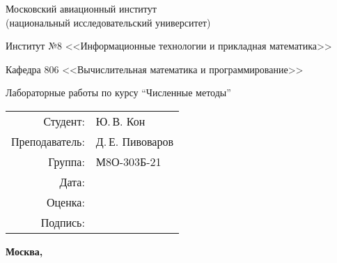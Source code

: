 \begin{titlepage}
    \begin{center}
    \bfseries

    {\Large Московский авиационный институт\\ (национальный исследовательский университет)

    }

    \vspace{48pt}

    {\large Институт №8 <<Информационные технологии и прикладная математика>>
    }

    \vspace{36pt}

    {\large Кафедра 806 <<Вычислительная математика и программирование>>

    }


    \vspace{48pt}

    Лабораторные работы по курсу \enquote{Численные методы}

    \end{center}

    \vspace{72pt}

    \begin{flushright}
    \begin{tabular}{rl}
    Студент: & Ю.\,В. Кон \\
    Преподаватель: & Д.\,Е. Пивоваров \\
    Группа: & М8О-303Б-21 \\
    Дата: & \\
    Оценка: & \\
    Подпись: & \\
    \end{tabular}
    \end{flushright}

    \vfill

    \begin{center}
    \bfseries
    Москва, \the\year
    \end{center}
    \end{titlepage}

    \pagebreak